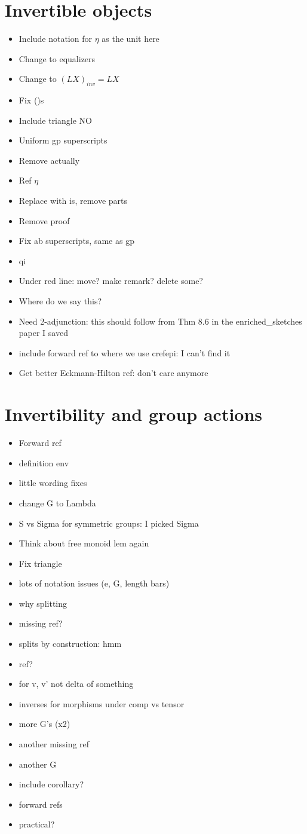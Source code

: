 \documentclass{amsart}
\begin{document}
\section{ Invertible objects}
\begin{itemize}
\item Include notation for $\eta$ as the unit here
\item Change to equalizers
\item Change to $(LX)_{inv} = LX$
\item Fix ()s
\item Include triangle NO
\item Uniform gp superscripts
\item Remove actually
\item Ref $\eta$
\item Replace with is, remove parts
\item Remove proof
\item Fix ab superscripts, same as gp
\item qi
\item Under red line: move? make remark? delete some?
\item Where do we say this?
\item Need 2-adjunction: this should follow from Thm 8.6 in the enriched\_sketches paper I saved
\item include forward ref to where we use cref{epi}: I can't find it
\item Get better Eckmann-Hilton ref: don't care anymore
\end{itemize}
\section{ Invertibility and group actions}
\begin{itemize}
\item Forward ref
\item definition env
\item little wording fixes
\item change G to Lambda
\item S vs Sigma for symmetric groups: I picked Sigma
\item Think about free monoid lem again
\item Fix triangle
\item lots of notation issues (e, G, length bars)
\item why splitting
\item missing ref?
\item splits by construction: hmm
\item ref?
\item for v, v' not delta of something
\item inverses for morphisms under comp vs tensor
\item more G's (x2)
\item another missing ref
\item another G
\item include corollary? 
\item forward refs
\item practical?
\end{itemize}
\end{document}
